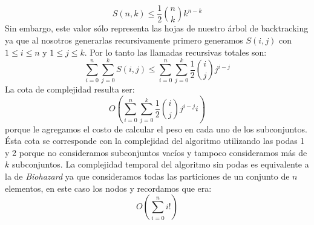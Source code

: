 \begin{displaymath}
  S(n, k) \leq \frac{1}{2}{n \choose k} k^{n-k}
\end{displaymath}
Sin embargo, este valor sólo representa las hojas de nuestro árbol de backtracking ya que al nosotros generarlas
recursivamente primero generamos $S(i, j)$ con $1 \leq i \leq n$ y $1 \leq j \leq k$. Por lo tanto las
llamadas recursivas totales son:
\begin{displaymath}
  \sum_{i=0}^n\sum_{j=0}^k S(i, j) \leq \sum_{i=0}^n\sum_{j=0}^k \frac{1}{2}{i \choose j} j^{i-j}
\end{displaymath}
La cota de complejidad resulta ser:
\begin{displaymath}
  O(\sum_{i=0}^n\sum_{j=0}^k \frac{1}{2}{i \choose j} j^{i-j}i)
\end{displaymath}
porque le agregamos el costo de calcular el peso en cada uno de los subconjuntos. Ésta cota se corresponde
con la complejidad del algoritmo utilizando las podas 1 y 2 porque no consideramos subconjuntos vacíos y
tampoco consideramos más de $k$ subconjuntos. La complejidad temporal del algoritmo sin podas es equivalente
a la de \textit{Biohazard} ya que consideramos todas las particiones de un conjunto de $n$ elementos, en este caso
los nodos y recordamos que era:
\begin{displaymath}
  O(\sum_{i=0}^ni!)
\end{displaymath}

